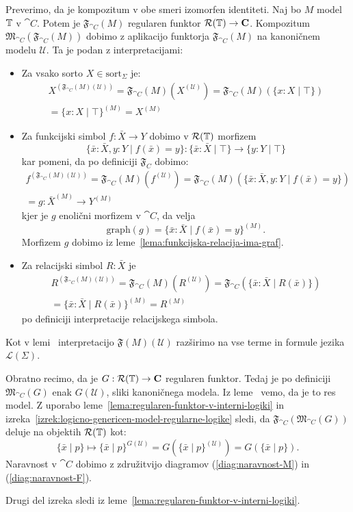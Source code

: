 \documentclass[../kategoricna_logika.tex]{subfiles}
\begin{document}
\begin{dokaz}
  Preverimo, da je kompozitum v obe smeri izomorfen identiteti.
  Naj bo $M$ model $\mathbb{T}$ v $\cat{C}$. Potem je $\mathfrak{F}_{\cat{C}}(M)$ regularen
  funktor $\mathcal{R}(\mathbb{T}) \to {\operatorname{\mathbf{C}}}$.
  Kompozitum $\mathfrak{M}_{\cat{C}}(\mathfrak{F}_{\cat{C}}(M))$ dobimo z aplikacijo
  funktorja $\mathfrak{F}_{\cat{C}}(M)$ na kanoničnem modelu $\mathcal{U}$. Ta je podan z
  interpretacijami:
  \begin{itemize}
  \item Za vsako sorto $X \in \mathrm{sort}_{\Sigma}$ je: 
    \begin{multline*}
    X^{(\mathfrak{F}_{\cat{C}}(M)(\mathcal{U}))} = \mathfrak{F}_{\cat{C}}(M)(X^{(\mathcal{U})}) = \mathfrak{F}_{\cat{C}}(M)(\{x:X\mid \top\})\\
    = \{x:X\mid \top\}^{(M)} = X^{(M)}
  \end{multline*}
\item Za funkcijski simbol $f : \bar{X} \to Y$ dobimo v $\mathcal{R}(\mathbb{T})$ morfizem
  \[ \{\bar{x}:\bar{X},y:Y \mid f(\bar{x}) = y\} : \{\bar{x}:\bar{X} \mid \top\} \to \{y:Y \mid \top\}\]
  kar pomeni, da po definiciji $\mathfrak{F}_C$ dobimo:
\begin{multline*}
  f^{(\mathfrak{F}_{\cat{C}}(M)(\mathcal{U}))} = \mathfrak{F}_{\cat{C}}(M)(f^{(\mathcal{U})})
  = \mathfrak{F}_{\cat{C}}(M)(\{\bar{x}:\bar{X},y:Y \mid f(\bar{x}) = y\})\\ = g : \bar{X}^{(M)} \to Y^{(M)}
\end{multline*}
kjer je $g$ enolični morfizem v $\cat{C}$, da velja
$$\mathrm{graph}(g) = \{\bar{x}:\bar{X} \mid f(\bar{x}) = y\}^{(M)}.$$
Morfizem $g$ dobimo iz leme~\ref{lema:funkcijska-relacija-ima-graf}.
\item Za relacijski simbol $R : \bar{X}$ je  
\begin{multline*}
  R^{(\mathfrak{F}_{\cat{C}}(M)(\mathcal{U}))} = \mathfrak{F}_{\cat{C}}(M)(R^{(\mathcal{U})})
  = \mathfrak{F}_{\cat{C}}(\{\bar{x}:\bar{X} \mid R(\bar{x})\}) \\
  = \{\bar{x}:\bar{X} \mid R(\bar{x})\}^{(M)} = R^{(M)}
\end{multline*}
po definiciji interpretacije relacijskega simbola.
  \end{itemize}
  Kot v lemi~\label{lema:regularen-funktor-slika-model-v-model} interpretacijo $\mathfrak{F}(M)(\mathcal{U})$
  razširimo na vse terme in formule jezika $\mathcal{L}(\Sigma)$.

  Obratno recimo, da je $G : \mathcal{R}(\mathbb{T}) \to {\operatorname{\mathbf{C}}}$ regularen funktor. Tedaj je po definiciji
  $\mathfrak{M}_{\cat{C}}(G)$ enak $G(\mathcal{U})$, sliki kanoničnega modela.
  Iz leme~\label{lema:regularen-funktor-slika-model-v-model} vemo, da je to res model.
  Z uporabo leme~\ref{lema:regularen-funktor-v-interni-logiki} in
  izreka~\ref{izrek:logicno-genericen-model-regularne-logike} sledi,
  da $\mathfrak{F}_{\cat{C}}(\mathfrak{M}_{\cat{C}}(G))$
  deluje na objektih $\mathcal{R}(\mathbb{T})$ kot:
  \[  \{ \bar{x} \mid p\} \mapsto \{ \bar{x} \mid p\}^{G(\mathcal{U})} =
    G(\{\bar{x} \mid p \}^{(\mathcal{U})}) = G(\{\bar{x} \mid p\}).\]
  Naravnost v $\cat{C}$ dobimo z
  združitvijo diagramov (\ref{diag:naravnost-M}) in
  (\ref{diag:naravnost-F}).

  Drugi del izreka sledi iz leme~\ref{lema:regularen-funktor-v-interni-logiki}.
\end{dokaz}
\end{document}
